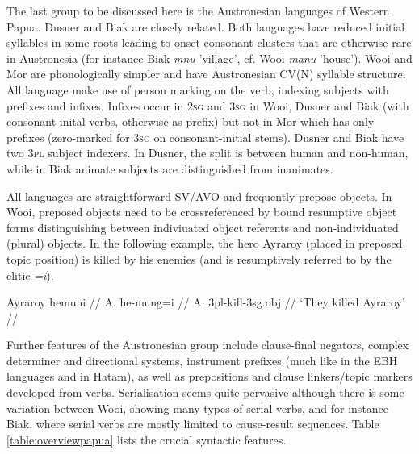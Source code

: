 The last group to be discussed here is the Austronesian languages of Western Papua. Dusner and Biak are closely related. Both languages have reduced initial syllables in some roots leading to onset consonant clusters that are otherwise rare in Austronesia (for instance Biak \textit{mnu} 'village', cf. Wooi \textit{manu} 'house'). Wooi and Mor are phonologically simpler and have Austronesian CV(N) syllable structure. All language make use of person marking on the verb, indexing subjects with prefixes and infixes. Infixes occur in \textsc{2sg} and \textsc{3sg} in Wooi, Dusner and Biak (with consonant-inital verbs, otherwise as prefix) but not in Mor which has only prefixes (zero-marked for \textsc{3sg} on consonant-initial stems). Dusner and Biak have two \textsc{3pl} subject indexers. In Dusner, the split is between human and non-human, while in Biak animate subjects are distinguished from inanimates.

All languages are straightforward SV/AVO and frequently prepose objects. In Wooi, preposed objects need to be crossreferenced by bound resumptive object forms distinguishing between indiviuated object referents and non-individuated (plural) objects. In the following example, the hero Ayraroy (placed in preposed topic position) is killed by his enemies (and is resumptively referred to by the clitic \textit{=i}).

\ex \label{}
\begingl
\gla Ayraroy hemuni // 
\glb A. he-mung=i //
\glc A. \acs{3}\acs{pl}-kill-\acs{3}\acs{sg}.\acs{obj} //
\glft `They killed Ayraroy' // 
\endgl
\xe

Further features of the Austronesian group include clause-final negators, complex determiner and directional systems, instrument prefixes (much like in the EBH languages and in Hatam), as well as prepositions and clause linkers/topic markers developed from verbs. Serialisation seems quite pervasive although there is some variation between Wooi, showing many types of serial verbs, and for instance Biak, where serial verbs are mostly limited to cause-result sequences. Table \ref{table:overviewpapua} lists the crucial syntactic features.

